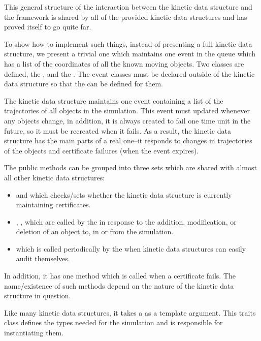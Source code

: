 This general structure of the interaction between the kinetic data
structure and the framework is shared by all of the provided kinetic
data structures and has proved itself to go quite far.

To show how to implement such things, instead of presenting a full
kinetic data structure, we present a trivial one which maintains one
event in the queue which has a list of the coordinates of all the
known moving objects.  Two classes are defined, the
, and the
. The event classes must be declared outside of the
kinetic data structure so that the  can be defined for
them. 

The kinetic data structure maintains one event containing a list of
the trajectories of all objects in the simulation. This
event must updated whenever any objects change, in addition, it is
always created to fail one time unit in the future, so it must be
recreated when it fails. As a result, the kinetic data structure has
the main parts of a real one--it responds to changes in trajectories
of the objects and certificate failures (when the event expires).

 The public methods can be grouped into three sets which are shared
 with almost all other kinetic data structures:
\begin{itemize}
\item {} and  which
  checks/sets whether the kinetic data structure is currently
  maintaining certificates.
\item {}, ,  which are called by the
   in response to the
  addition, modification, or deletion of an object to, in or from the
  simulation.
\item {} which is called periodically by the
   when kinetic data structures can
  easily audit themselves.
\end{itemize} 

In addition, it has one method which is called when a certificate
fails. The name/existence of such methods depend on the nature of the
kinetic data structure in question.

Like many kinetic data structures, it takes a 
as a template argument. This traits class defines the types needed for
the simulation and is responsible for instantiating them.

 \label{fig:trivial_usage_program}
